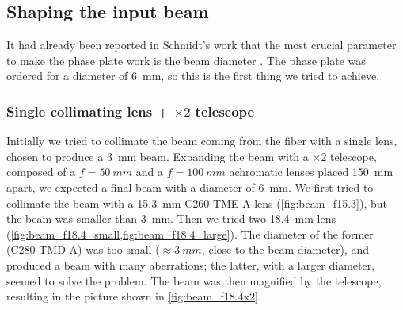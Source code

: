 \subsection{Shaping the input beam}
It had already been reported in Schmidt's work that the most crucial parameter to make the phase plate work is the beam diameter \cite{schmidt2021}. The phase plate was ordered for a diameter of \SI{6}{mm}, so this is the first thing we tried to achieve.

\subsubsection{Single collimating lens + $\times 2$ telescope}
Initially we tried to collimate the beam coming from the fiber with a single lens, chosen to produce a \SI{3}{mm} beam. Expanding the beam with a $\times 2$ telescope, composed of a $f=\SI{50}{mm}$ and a $f=\SI{100}{mm}$ achromatic lenses placed \SI{150}{mm} apart, we expected a final beam with a diameter of \SI{6}{mm}. We first tried to collimate the beam with a \SI{15.3}{mm} C260-TME-A lens (\cref{fig:beam_f15.3}), but the beam was smaller than \SI{3}{mm}. Then we tried two \SI{18.4}{mm} lens (\cref{fig:beam_f18.4_small,fig:beam_f18.4_large}). The diameter of the former (C280-TMD-A) was too small ($\approx \SI{3}{mm}$, close to the beam diameter), and produced a beam with many aberrations; the latter, with a larger diameter, seemed to solve the problem. The beam was then magnified by the telescope, resulting in the picture shown in \cref{fig:beam_f18.4x2}.

